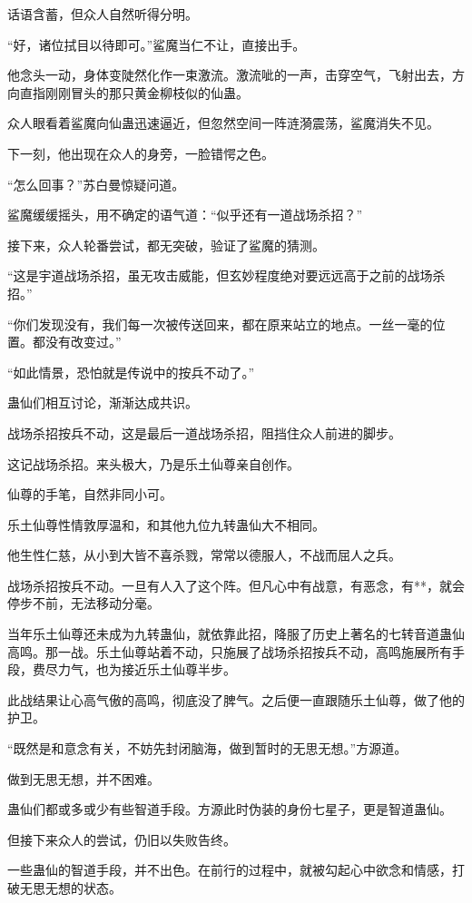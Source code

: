 \begin{this_body}
话语含蓄，但众人自然听得分明。

“好，诸位拭目以待即可。”鲨魔当仁不让，直接出手。

他念头一动，身体变陡然化作一束激流。激流呲的一声，击穿空气，飞射出去，方向直指刚刚冒头的那只黄金柳枝似的仙蛊。

众人眼看着鲨魔向仙蛊迅速逼近，但忽然空间一阵涟漪震荡，鲨魔消失不见。

下一刻，他出现在众人的身旁，一脸错愕之色。

“怎么回事？”苏白曼惊疑问道。

鲨魔缓缓摇头，用不确定的语气道：“似乎还有一道战场杀招？”

接下来，众人轮番尝试，都无突破，验证了鲨魔的猜测。

“这是宇道战场杀招，虽无攻击威能，但玄妙程度绝对要远远高于之前的战场杀招。”

“你们发现没有，我们每一次被传送回来，都在原来站立的地点。一丝一毫的位置。都没有改变过。”

“如此情景，恐怕就是传说中的按兵不动了。”

蛊仙们相互讨论，渐渐达成共识。

战场杀招按兵不动，这是最后一道战场杀招，阻挡住众人前进的脚步。

这记战场杀招。来头极大，乃是乐土仙尊亲自创作。

仙尊的手笔，自然非同小可。

乐土仙尊性情敦厚温和，和其他九位九转蛊仙大不相同。

他生性仁慈，从小到大皆不喜杀戮，常常以德服人，不战而屈人之兵。

战场杀招按兵不动。一旦有人入了这个阵。但凡心中有战意，有恶念，有**，就会停步不前，无法移动分毫。

当年乐土仙尊还未成为九转蛊仙，就依靠此招，降服了历史上著名的七转音道蛊仙高鸣。那一战。乐土仙尊站着不动，只施展了战场杀招按兵不动，高鸣施展所有手段，费尽力气，也为接近乐土仙尊半步。

此战结果让心高气傲的高鸣，彻底没了脾气。之后便一直跟随乐土仙尊，做了他的护卫。

“既然是和意念有关，不妨先封闭脑海，做到暂时的无思无想。”方源道。

做到无思无想，并不困难。

蛊仙们都或多或少有些智道手段。方源此时伪装的身份七星子，更是智道蛊仙。

但接下来众人的尝试，仍旧以失败告终。

一些蛊仙的智道手段，并不出色。在前行的过程中，就被勾起心中欲念和情感，打破无思无想的状态。


\end{this_body}

